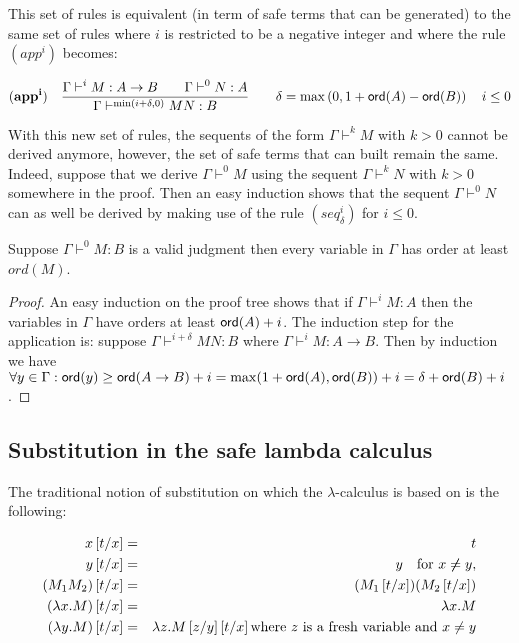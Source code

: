 \begin{rem}
\label{rem:rulesineg}

This set of rules is equivalent (in term of safe terms that can be
generated) to the same set of rules where $i$ is restricted to be a
negative integer and where the rule $(app^i)$ becomes:

$$ \mathbf{(app^i)} \quad  \frac{\displaystyle \Gamma \vdash^i M : A\rightarrow B
                                        \qquad \Gamma \vdash^{0} N : A}{\Gamma  \vdash^{\min(i+\delta,0)} M N : B}
                                    \qquad
                                   \delta = \max\left(0, 1 + {\sf ord}(A) - {\sf ord}(B)\right) \quad i \leq 0 $$

With this new set of rules, the sequents of the form $\Gamma
\vdash^{k} M$ with $k>0$ cannot be derived anymore, however, the set
of safe terms that can built remain the same. Indeed, suppose that
we derive $\Gamma \vdash^0 M$ using the sequent $\Gamma \vdash^k N$
with $k>0$ somewhere in the proof. Then an easy induction shows that
the sequent $\Gamma \vdash^0 N$ can as well be derived by making use
of the rule $(seq^i_\delta)$ for $i\leq 0$.
\end{rem}

\begin{lem}
\label{lem:nonhomosafe_basic_prop} Suppose $\Gamma \vdash^0 M : B$
is a valid judgment then every variable in $\Gamma$ has order at
least $ord(M)$.
\end{lem}
\begin{proof}
An easy induction on the proof tree shows that if $\Gamma \vdash^{i}
M : A$ then the variables in $\Gamma$ have orders at least
${\sf ord}(A)+i$. The induction step for the application is: suppose
$\Gamma  \vdash^{i+\delta} M N : B$ where $\Gamma \vdash^i M :
A\rightarrow B$. Then by induction we have $\forall y \in \Gamma :
{\sf ord}(y) \geq {\sf ord}(A\rightarrow B) + i = \max(1+{\sf ord}(A), {\sf ord}(B))+i =
\delta + {\sf ord}(B) + i$.
\end{proof}

\subsection{Substitution in the safe lambda calculus}

The traditional notion of substitution on which the $\lambda$-calculus is based on is the following:
\begin{dfn}[Substitution]
\label{dfn:subst}
\begin{eqnarray*}
x \left[ t/x \right] &=& t\\
 y\left[ t/x \right] &=& y \quad \mbox{for } x \not \neq y,\\
(M_1 M_2) \left[ t/x \right] &=& (M_1 \left[ t/x \right]) (M_2 \left[ t/x \right])\\
(\lambda x . M) \left[ t/x \right] &=& \lambda x . M\\
(\lambda y . M) \left[ t/x \right] &=& \lambda z . M \left[ z/y \right]
\left[ t/x \right] \mbox{where $z$ is a fresh variable and $x\not = y$}
\end{eqnarray*}
\end{dfn}

